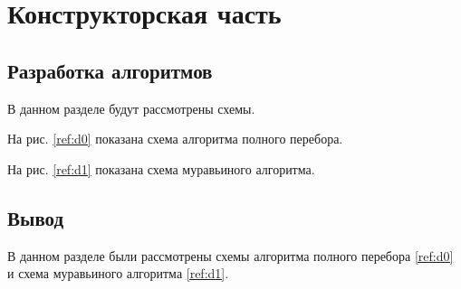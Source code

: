 \chapter{Конструкторская часть}
\label{cha:design}

\section{Разработка алгоритмов}

В данном разделе будут рассмотрены схемы.

На рис. \ref{ref:d0} показана схема алгоритма полного перебора.

\begin{figure}[ht!]
\end{figure}

На рис. \ref{ref:d1} показана схема муравьиного алгоритма.

\begin{figure}[ht!]
\end{figure}

\section{Вывод}

В данном разделе были рассмотрены схемы алгоритма полного перебора \ref{ref:d0}
и схема муравьиного алгоритма \ref{ref:d1}.





